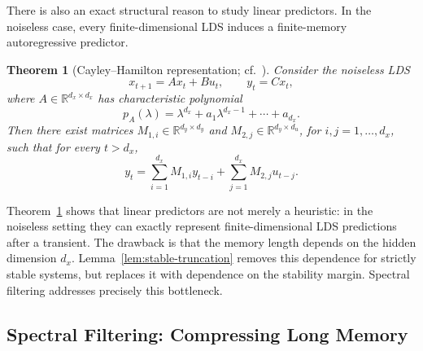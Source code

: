 \documentclass[11pt]{article}
\theoremstyle{plain}
\newtheorem{theorem}{Theorem}[section]
\theoremstyle{definition}
\theoremstyle{remark}
\newcommand{\R}{\mathbb{R}}
\begin{document}
There is also an exact structural reason to study linear predictors. In the noiseless case, every finite-dimensional LDS induces a finite-memory autoregressive predictor.

\begin{theorem}[Cayley--Hamilton representation; cf.\ {\citet[Thm.~9.4]{hazan2025onlinecontrol}}]
\label{thm:cayley-hamilton}
Consider the noiseless LDS
\[
    x_{t+1}=Ax_t+Bu_t,\qquad y_t=Cx_t,
\]
where $A\in\R^{d_x\times d_x}$ has characteristic polynomial
\[
    p_A(\lambda)=\lambda^{d_x}+a_1\lambda^{d_x-1}+\cdots+a_{d_x}.
\]
Then there exist matrices $M_{1,i}\in\R^{d_y\times d_y}$ and $M_{2,j}\in\R^{d_y\times d_u}$, for $i,j=1,\ldots,d_x$, such that for every $t>d_x$,
\begin{equation}
    y_t
    =
    \sum_{i=1}^{d_x} M_{1,i} y_{t-i}
    +
    \sum_{j=1}^{d_x} M_{2,j} u_{t-j}.
    \label{eq:cayley-hamilton-predictor}
\end{equation}
\end{theorem}

Theorem~\ref{thm:cayley-hamilton} shows that linear predictors are not merely a heuristic: in the noiseless setting they can exactly represent finite-dimensional LDS predictions after a transient. The drawback is that the memory length depends on the hidden dimension $d_x$. Lemma~\ref{lem:stable-truncation} removes this dependence for strictly stable systems, but replaces it with dependence on the stability margin. Spectral filtering addresses precisely this bottleneck.

\subsection{Spectral Filtering: Compressing Long Memory}
\label{sec:spectral-filtering-prelim}
\end{document}
